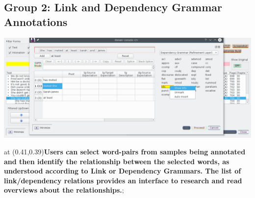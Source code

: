 
    \begin{frame}{}
\section{Group 2: Link and Dependency Grammar Annotations}

        \begin{annotatedFigure}{0pt}{0pt}
            {\includegraphics[scale=1]{texs/trilink.png}}
            
  \node [text width=7cm,inner sep=14pt,align=justify,%
  draw opacity=0.9,line width=2mm, fill opacity=0.9,
  draw = logoCyan!50!brown,
  top color=brown!20,text=black,
  bottom color=logoCyan!2,
  rounded corners=6pt]
   at (0.41,0.39){\annfont\textbf{Users can select word-pairs 
   from samples being annotated and then identify 
   the relationship between the selected words, as understood 
   according to Link or Dependency Grammars.  The 
   list of link/dependency relations provides 
   an interface to research and read overviews about the 
   relationships.}};



            
  

  
        \end{annotatedFigure}

\end{frame}
